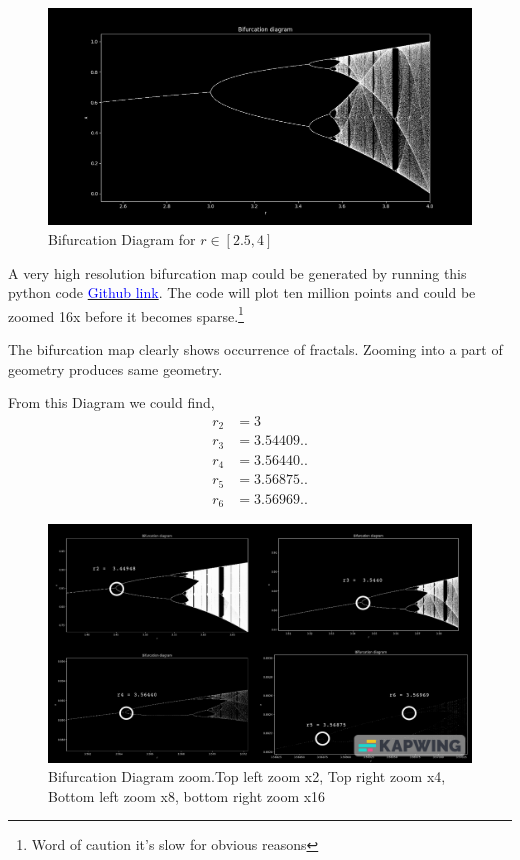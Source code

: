 \documentclass{report}
\begin{document}
\begin{figure}[!h]
    \centering
    \includegraphics[scale=.45]{images/BifurcationDiag.png}
    \caption{Bifurcation Diagram for $r \in [2.5,4]$}
    \label{fig:my_label4}
\end{figure}

A very high resolution bifurcation map could be generated by running this python code \href{https://github.com/notcamelcase01/ME5010Project/blob/master/high\_res\_bfmap.py}{\textcolor{blue}{Github link}}. The code will plot ten million points and could be zoomed 16x before it becomes sparse.\footnote[3]{Word of caution it's slow for obvious reasons}

The bifurcation map clearly shows occurrence of fractals. Zooming into a part of geometry produces same geometry.

From this Diagram we could find,
\begin{align}
    r_2 &= 3 \nonumber \\
    r_3 &= 3.54409.. \nonumber \\
    r_4 &= 3.56440.. \nonumber \\
    r_5 &= 3.56875.. \nonumber \\
    r_6 &= 3.56969.. \nonumber
\end{align}
\newpage

\begin{figure}[!h]
    \centering
    \includegraphics[scale=.35]{images/bfcol.png}
    \caption{Bifurcation Diagram zoom.Top left zoom x2, Top right zoom x4, Bottom left zoom x8, bottom right zoom x16}
    \label{fig:my_label5}
\end{figure}
\end{document}
